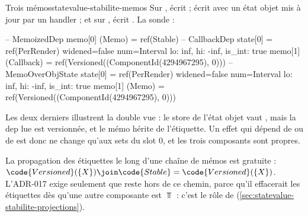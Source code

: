 \begin{exemple}{Trois mémos}{statevalue-stabilite-memos}
  Sur ,  écrit
   ;  écrit
   avec  un état objet
  mis à jour par un handler ; et sur , 
  écrit . La sonde :
\begin{sortie}
-- MemoizedDep
   memo[0] (Memo) = ref(Stable)
-- CallbackDep
   state[0] = ref(PerRender)   widened=false  num=Interval { lo: inf, hi: -inf, is_int: true }
   memo[1] (Callback) = ref(Versioned({(ComponentId(4294967295), 0)}))
-- MemoOverObjState
   state[0] = ref(PerRender)   widened=false  num=Interval { lo: inf, hi: -inf, is_int: true }
   memo[1] (Memo) = ref(Versioned({(ComponentId(4294967295), 0)}))
\end{sortie}
  Les deux derniers illustrent la double vue : le store de l'état objet
  vaut , mais la dep lue est versionnée, et le mémo
  hérite de l'étiquette. Un effet qui dépend de  ou de 
  est donc \og ne change qu'aux sets du slot 0\fg{}, et les trois composants
  sont propres.
\end{exemple}

La propagation des étiquettes le long d'une chaîne de mémos est gratuite :
$\code{Versioned}(\{X\}) \join \code{Stable} = \code{Versioned}(\{X\})$.
L'ADR-017 exige seulement que  reste hors de ce chemin,
parce qu'il effacerait les étiquettes dès qu'une autre composante est
$\Top$ : c'est le rôle de 
(\cref{sec:statevalue-stabilite-projections}).

